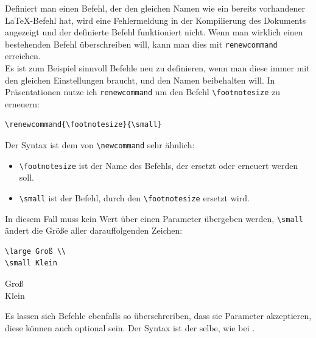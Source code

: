 \documentclass[ngerman,12pt,titlepage]{scrartcl}
\newenvironment{hlbox}{\begin{tcolorbox}[enhanced,colback=white,colframe=white,sharpish corners,fuzzy halo=0.5mm with lightgray]}{\end{tcolorbox}}
\begin{document}
Definiert man einen Befehl, der den gleichen Namen wie ein bereits vorhandener \LaTeX-Befehl hat, wird eine Fehlermeldung in der Kompilierung des Dokuments angezeigt und der definierte Befehl funktioniert nicht. Wenn man wirklich einen bestehenden Befehl überschreiben will, kann man dies mit \texttt{renewcommand} erreichen. \\
Es ist zum Beispiel sinnvoll Befehle neu zu definieren, wenn man diese immer mit den gleichen Einstellungen braucht, und den Namen beibehalten will. In Präsentationen nutze ich \texttt{renewcommand} um den Befehl \lstinline|\footnotesize| zu erneuern:
\begin{lstlisting}[caption = kleine Fußnoten]
% Setze die größe der Fußnoten auf klein
\renewcommand{\footnotesize}{\small}
\end{lstlisting}
Der Syntax ist dem von \lstinline|\newcommand| sehr ähnlich:
\begin{itemize}
\item[] \lstinline|\footnotesize| ist der Name des Befehls, der ersetzt oder erneuert werden soll.
\item[] \lstinline|\small| ist der Befehl, durch den \lstinline|\footnotesize| ersetzt wird. 
\end{itemize}
In diesem Fall muss kein Wert über einen Parameter übergeben werden, \lstinline|\small| ändert die Größe aller darauffolgenden Zeichen:
\begin{lstlisting}[caption = groß und klein]
\large Groß \\
\small Klein
\end{lstlisting}
\begin{hlbox}
\large Groß \\
\small Klein
\end{hlbox}
Es lassen sich Befehle ebenfalls so überschreriben, dass sie Parameter akzeptieren, diese können auch optional sein. Der Syntax ist der selbe, wie bei .
\newpage
\end{document}
